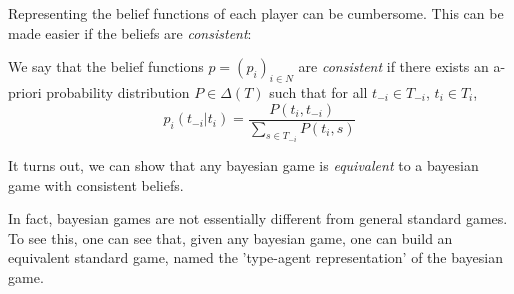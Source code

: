  Representing the belief functions of each player can be cumbersome. This can be made easier if the beliefs are \emph{consistent}:
 \begin{definition}
 We say that the belief functions $p = (p_i)_{i \in N}$ are \emph{consistent} if there exists an a-priori probability distribution $P \in \Delta(T)$ such that for all $t_{-i} \in T_{-i} $, $t_i \in T_i$,
  $$ p_i(t_{-{i}} | t_i) = \frac{P(t_i, t_{-i})}{\sum_{s \in T_{-i}} P( t_i, s) } $$
 \end{definition}
It turns out, we can show that any bayesian game is \emph{equivalent} to a bayesian game with consistent beliefs.


In fact, bayesian games are not essentially different from general standard games.  To see this, one can see that, given any bayesian game,  one can build an equivalent standard game, named the 'type-agent representation' of the bayesian game.

